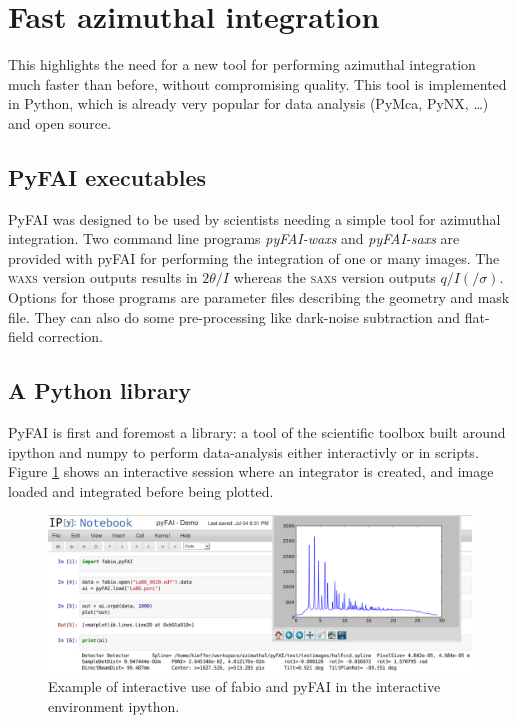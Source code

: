 \documentclass[a4paper]{jpconf}
\begin{document}
\section{Fast azimuthal integration}
This highlights the need for a new tool for performing azimuthal integration
much faster than before, without compromising quality. This tool is
implemented in Python, which is already very popular for data
analysis (PyMca\cite{pymca}, PyNX\cite{pynx}, \ldots) and open source.

\subsection{PyFAI executables}
PyFAI was designed to be used by scientists needing a simple tool for azimuthal
integration. Two command line programs \textit{pyFAI-waxs} and
\textit{pyFAI-saxs} are provided with pyFAI for performing the
integration of one or many images. The \textsc{waxs} version outputs results in
$2\theta /I$  whereas the \textsc{saxs} version outputs $q/I(/\sigma )$.
Options for those programs are parameter files describing the geometry and mask file. They can
also do some  pre-processing like dark-noise subtraction and flat-field correction.

\subsection{A Python library}
PyFAI is first and foremost a library: a tool of the scientific
toolbox built around ipython\cite{ipython} and numpy\cite{numpy} to
perform data-analysis either interactivly or in scripts.
Figure \ref{notebook} shows an interactive session where an integrator is
created, and image loaded and integrated before being plotted.

\begin{figure}[h]
\begin{center}
\includegraphics[width=15cm]{img/notebook-l.eps}
\caption{\label{notebook} Example of interactive use of fabio and pyFAI in the
interactive environment ipython.}
\end{center}
\end{figure}
\end{document}
